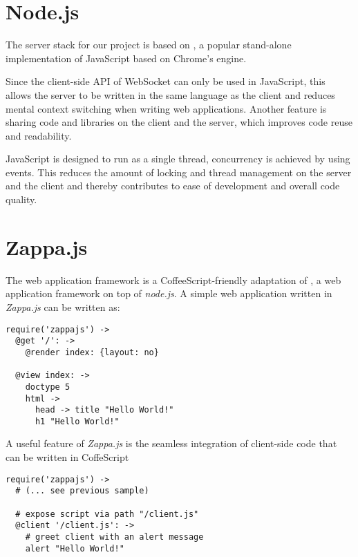 \section{Node.js}

The server stack for our project is based on
, a popular
stand-alone implementation of JavaScript based on Chrome's  engine.

Since the client-side API of WebSocket can only be used in JavaScript, this
allows the server to be written in the same language as the client and reduces
mental context switching when writing web applications. Another feature is
sharing code and libraries on the client and the server, which improves code
reuse and readability.

JavaScript is designed to run as a single thread, concurrency is achieved by
using events. This reduces the amount of locking and thread management on the
server and the client and thereby contributes to ease of development and overall
code quality.

\section{Zappa.js}

The web application framework  is
a CoffeeScript-friendly adaptation of
, a web application framework
on top of \emph{node.js}. A simple web application written in \emph{Zappa.js}
can be written as:

\begin{verbatim}
require('zappajs') ->
  @get '/': ->
    @render index: {layout: no}

  @view index: ->
    doctype 5
    html ->
      head -> title "Hello World!"
      h1 "Hello World!"
\end{verbatim}

\pagebreak
A useful feature of \emph{Zappa.js} is the seamless integration of client-side
code that can be written in CoffeScript

\begin{verbatim}
require('zappajs') ->
  # (... see previous sample)

  # expose script via path "/client.js"
  @client '/client.js': ->
    # greet client with an alert message
    alert "Hello World!"
\end{verbatim}


